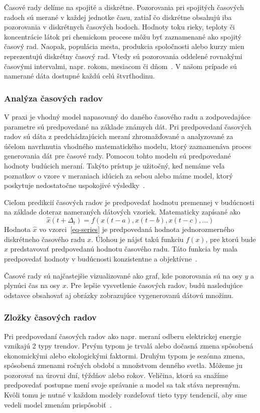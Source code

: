\documentclass[a4paper,slovak,12pt,appendix]{article}
\begin{document}
Časové rady delíme na spojité a diskrétne. Pozorovania pri spojitých časových
radoch sú merané v každej jednotke času, zatiaľ čo diskrétne obsahujú iba
pozorovania v diskrétnych časových bodoch. Hodnoty toku rieky, teploty
či koncentrácie látok pri chemickom procese môžu byť zaznamenané ako spojitý
časový rad. Naopak, populácia mesta, produkcia spoločnosti alebo kurzy mien
reprezentujú diskrétny časový rad. Vtedy sú pozorovania oddelené rovnakými
časovými intervalmi, napr. rokom, mesiacom či dňom~\cite{Agrawal2013}. V našom
prípade sú namerané dáta dostupné každú celú štvrťhodinu.

\subsubsection{Analýza časových radov}
\label{time-series-analysis}
V praxi je vhodný model napasovaný do daného časového radu a zodpovedajúce
parametre sú predpovedané na základe známych dát. Pri predpovedaní časových
radov sú dáta z predchádzajúcich meraní zhromažďované a analyzované za účelom
navrhnutia vhodného matematického modelu, ktorý zaznamenáva proces generovania
dát pre časové rady. Pomocou tohto modelu sú predpovedané hodnoty budúcich
meraní. Takýto prístup je užitočný, keď nemáme veľa poznatkov o vzore
v meraniach idúcich za sebou alebo máme model, ktorý poskytuje nedostatočne
uspokojivé výsledky~\cite{Agrawal2013}.

Cieľom predikcií časových radov je predpovedať hodnotu premennej v budúcnosti
na základe doteraz nameraných dátových vzoriek. Matematicky zapísané ako
\begin{equation}
  \hat{x}(t+\Delta_t) = f(x(t-a), x(t-b), x(t-c), ...)
  \label{eq-series}
\end{equation}
Hodnota $\hat{x}$ vo vzorci~\ref{eq-series} je predpovedaná hodnota
jednorozmerného diskrétneho časového radu $x$. Úlohou je nájsť takú funkciu
$f(x)$, pre ktorú bude $\hat{x}$ predstavovať predpovedanú hodnotu časového
radu. Táto funkcia by mala predpovedať hodnoty v budúcnosti konzistentne
a objektívne~\cite{Sapankevych2009}.

Časové rady sú najčastejšie vizualizované ako graf, kde pozorovania sú na
osy $y$ a plynúci čas na osy $x$. Pre lepšie vysvetlenie časových radov, budú
nasledujúce odstavce obsahovať aj obrázky zobrazujúce vygenerovanú dátovú
množinu.

\subsubsection{Zložky časových radov}
Pri predpovedaní časových radov ako napr. meraní odberu elektrickej energie
vznikajú 2 typy trendov. Prvým typom je trvalá alebo dočasná zmena spôsobená
ekonomickými alebo ekologickými faktormi. Druhým typom je sezónna zmena,
spôsobená zmenami ročných období a množstvom denného svetla. Môžeme ju pozorovať
na úrovni dní, týždňov alebo rokov. Veličina, ktorú sa snažíme predpovedať
postupne mení svoje správanie a model sa tak stáva nepresným. Kvôli tomu je
nutné v každom modely rozdeľovať tieto typy tendencií, aby sme vedeli model
zmenám prispôsobiť~\cite{Grmanova2016}.
\end{document}

